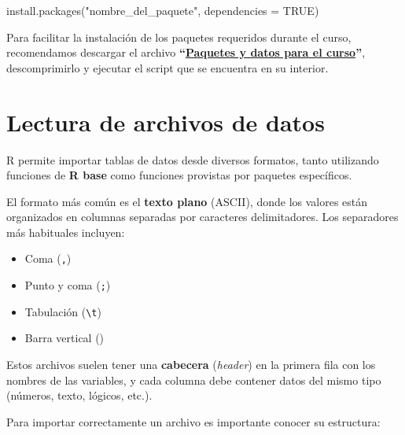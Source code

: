 \documentclass[
  spanish,
  a4paper,
]{scrbook}
\newenvironment{Shaded}{\begin{snugshade}}{\end{snugshade}}
\newcommand{\AttributeTok}[1]{\textcolor[rgb]{0.40,0.45,0.13}{#1}}
\newcommand{\ConstantTok}[1]{\textcolor[rgb]{0.56,0.35,0.01}{#1}}
\newcommand{\FunctionTok}[1]{\textcolor[rgb]{0.28,0.35,0.67}{#1}}
\newcommand{\NormalTok}[1]{\textcolor[rgb]{0.00,0.23,0.31}{#1}}
\newcommand{\StringTok}[1]{\textcolor[rgb]{0.13,0.47,0.30}{#1}}
\begin{document}
\begin{Shaded}
\begin{Highlighting}[]
\FunctionTok{install.packages}\NormalTok{(}\StringTok{"nombre\_del\_paquete"}\NormalTok{, }\AttributeTok{dependencies =} \ConstantTok{TRUE}\NormalTok{)}
\end{Highlighting}
\end{Shaded}

\begin{tcolorbox}[enhanced jigsaw, arc=.35mm, bottomrule=.15mm, breakable, colback=white, colframe=quarto-callout-note-color-frame, left=2mm, leftrule=.75mm, opacityback=0, rightrule=.15mm, toprule=.15mm]

Para facilitar la instalación de los paquetes requeridos durante el
curso, recomendamos descargar el archivo
\textbf{``\href{../files/datos_y_paquetes.zip}{Paquetes y datos para el
curso}''}, descomprimirlo y ejecutar el script que se encuentra en su
interior.

\end{tcolorbox}

\section{Lectura de archivos de
datos}\label{lectura-de-archivos-de-datos}

R permite importar tablas de datos desde diversos formatos, tanto
utilizando funciones de \textbf{R base} como funciones provistas por
paquetes específicos.

El formato más común es el \textbf{texto plano} (ASCII), donde los
valores están organizados en columnas separadas por caracteres
delimitadores. Los separadores más habituales incluyen:

\begin{itemize}
\item
  Coma (\texttt{,})
\item
  Punto y coma (\texttt{;})
\item
  Tabulación (\texttt{\textbackslash{}t})
\item
  Barra vertical (\texttt{\textbar{}})
\end{itemize}

Estos archivos suelen tener una \textbf{cabecera} (\emph{header}) en la
primera fila con los nombres de las variables, y cada columna debe
contener datos del mismo tipo (números, texto, lógicos, etc.).

Para importar correctamente un archivo es importante conocer su
estructura:
\end{document}
